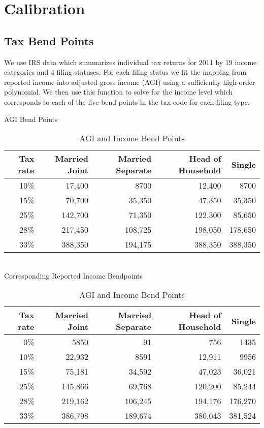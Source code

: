 \documentclass[12pt]{report}
\theoremstyle{definition}
\begin{document}
\section{Calibration}
  \subsection{Tax Bend Points}
      We use IRS data which summarizes individual tax returns for 2011 by 19 income categories and 4 filing statuses.  For each filing status we fit the mapping from reported income into adjusted gross income (AGI) using a sufficiently high-order polynomial.  We then use this function to solve for the income level which corresponds to each of the five bend points in the tax code for each filing type.
      \begin{table}[ht]
        \caption{AGI and Income Bend Points}
        \label{Calib_Bend_Tab1}
        \centering
        AGI Bend Points
        \begin{tabular}{|r|r|r|r|r|} \hline 
          Tax rate & Married Joint & Married Separate & Head of Household & Single \\ \hline 
          10\% & 17,400 & 8700 & 12,400 & 8700 \\ \hline 
          15\% & 70,700 & 35,350 & 47,350 & 35,350 \\ \hline 
          25\% & 142,700 & 71,350 & 122,300 & 85,650 \\ \hline 
          28\% & 217,450 & 108,725 & 198,050 & 178,650 \\ \hline 
          33\% & 388,350 & 194,175 & 388,350 & 388,350 \\ \hline 
        \end{tabular}
        \\
        Corresponding Reported Income Bendpoints
        \begin{tabular}{|r|r|r|r|r|} \hline 
          Tax rate & Married Joint & Married Separate & Head of Household & Single \\ \hline 
          0\%  & 5850  & 91 & 756 & 1435 \\ \hline 
          10\% & 22,932 & 8591 & 12,911 & 9956 \\ \hline 
          15\% & 75,181 & 34,592 & 47,023 & 36,021 \\ \hline 
          25\% & 145,866 & 69,768 & 120,200 & 85,244 \\ \hline 
          28\% & 219,162 & 106,245 & 194,176 & 176,270 \\ \hline 
          33\% & 386,798 & 189,674 & 380,043 & 381,524 \\ \hline 
        \end{tabular}
      \end{table}
\end{document}
